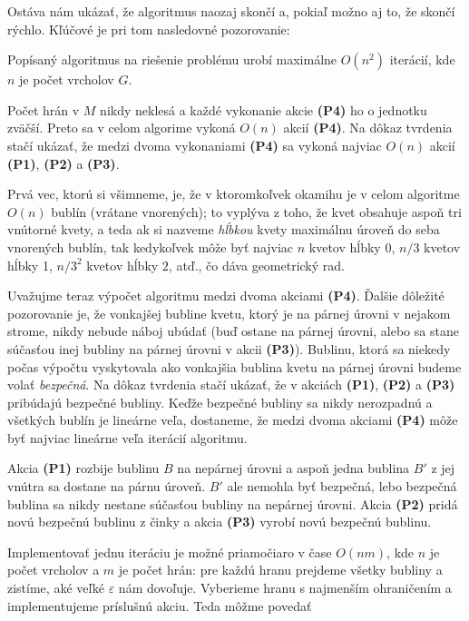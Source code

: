\noindent
Ostáva nám ukázať, že algoritmus naozaj skončí a, pokiaľ možno aj to, že skončí rýchlo. Kľúčové je pri tom
nasledovné pozorovanie:

\begin{lema}
  Popísaný algoritmus na riešenie problému \minfactor urobí maximálne $O(n^2)$ iterácií, kde $n$ je počet vrcholov
  $G$.
\end{lema}
\begin{dokaz}
  Počet hrán v $M$ nikdy neklesá a každé vykonanie akcie {\bf (P4)} ho o jednotku zväčší. Preto sa v celom algorime
  vykoná $O(n)$ akcií  {\bf (P4)}. Na dôkaz tvrdenia stačí ukázať, že medzi dvoma vykonaniami  {\bf (P4)}
  sa vykoná najviac $O(n)$ akcií  {\bf (P1)}, {\bf (P2)} a {\bf (P3)}.

\noindent
  Prvá vec, ktorú si všimneme, je, že v ktoromkoľvek okamihu je v celom algoritme $O(n)$ bublín (vrátane vnorených);
  to vyplýva z toho, že kvet obsahuje aspoň tri vnútorné kvety, a teda ak si nazveme {\em hĺbkou } kvety maximálnu
  úroveň do seba  vnorených bublín, 
  tak kedykoľvek môže byť najviac $n$ kvetov hĺbky 0, $n/3$ kvetov hĺbky 1, $n/3^2$ kvetov
  hĺbky $2$, atď., čo dáva geometrický rad.

\noindent
 Uvažujme teraz výpočet algoritmu medzi dvoma akciami {\bf (P4)}. Ďalšie dôležité pozorovanie je, že
 vonkajšej bubline kvetu, ktorý je na párnej úrovni v nejakom strome, nikdy nebude náboj ubúdať (buď ostane na párnej
 úrovni, alebo sa stane súčasťou inej bubliny na párnej úrovni v akcii {\bf(P3)}). Bublinu, ktorá sa niekedy
 počas výpočtu vyskytovala ako vonkajšia bublina kvetu na párnej úrovni budeme volať {\em bezpečná}.
 Na dôkaz tvrdenia stačí ukázať, že v akciách {\bf (P1)}, {\bf (P2)} a {\bf (P3)} pribúdajú bezpečné bubliny.
 Keďže bezpečné bubliny sa nikdy nerozpadnú a všetkých bublín je lineárne veľa, dostaneme, že medzi dvoma
 akciami {\bf (P4)} môže byť najviac lineárne veľa iterácií algoritmu.

 \noindent
 Akcia {\bf (P1)} rozbije bublinu $B$ na nepárnej úrovni a aspoň jedna bublina $B'$ 
 z jej vnútra sa dostane na párnu úroveň.
 $B'$ ale nemohla byť bezpečná, lebo bezpečná bublina sa nikdy nestane súčasťou bubliny na nepárnej úrovni.
 Akcia {\bf (P2)} pridá novú bezpečnú bublinu z činky a akcia {\bf (P3)} vyrobí novú bezpečnú bublinu.
\end{dokaz}


\noindent
Implementovať jednu iteráciu je možné priamočiaro v čase $O(nm)$, kde $n$ je počet vrcholov a $m$ je počet hrán:
pre každú hranu prejdeme všetky bubliny a zistíme, aké veľké $\varepsilon$ nám dovoľuje. Vyberieme hranu
s najmenším ohraničením a implementujeme príslušnú akciu. Teda môžme povedať

